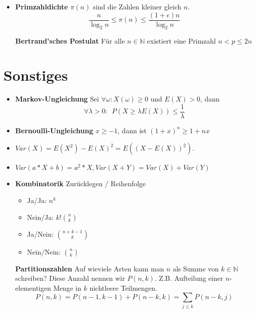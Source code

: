\documentclass[landscape, 8pt, a4paper]{extarticle}
\newcommand{\N}{\mathbb{N}}
\begin{document}
\begin{multicols}{3}
\begin{itemize}
		\item \textbf{Primzahldichte} $\pi(n)$ sind die Zahlen kleiner gleich $n$.
		\begin{equation*}
		 	\frac{n}{\log_2 n}\leq\pi(n)\leq \frac{(1+\epsilon)n}{\log_2 n}
		\end{equation*} 

		\textbf{Bertrand'sches Postulat} Für alle $n\in\N$ existiert eine Primzahl $n<p\leq 2n$
	\end{itemize}
	
	\columnbreak

	\section{Sonstiges}
	\begin{itemize}
		\item \textbf{Markov-Ungleichung} Sei $\forall \omega: X(\omega)\geq 0$ und $E(X)>0$, dann
		\begin{equation*}
			\forall \lambda >0: \enspace P(X\geq \lambda E(X))\leq \frac 1\lambda
		\end{equation*}

		\item \textbf{Bernoulli-Ungleichung} $x\geq -1$, dann ist $(1+x)^n\geq 1+nx$

		\item $Var(X)=E(X^2)-E(X)^2=E((X-E(X))^2)$.
		\item $Var(a*X+b)=a^2*X, Var(X+Y)=Var(X)+Var(Y)$

		\item \textbf{Kombinatorik} Zurücklegen / Reihenfolge
		\begin{itemize}
			\item Ja/Ja: $n^k$
			\item Nein/Ja: $k!\binom nk$
			\item Ja/Nein: $\binom{n+k-1}{k}$
			\item Nein/Nein: $\binom nk$
		\end{itemize}

		\textbf{Partitionszahlen}
		Auf wieviele Arten kann man $n$ als Summe von $k\in \N$ schreiben? Diese Anzahl nennen wir $P(n,k)$. Z.B. Aufteilung einer $n$-elementigen Menge in $k$ nichtleere Teilmengen.
		\begin{equation*}
			P(n,k)=P(n-1,k-1)+P(n-k,k)=\sum_{j\leq k}P(n-k,j)
		\end{equation*}
	\end{itemize}
\end{multicols}
\end{document}
